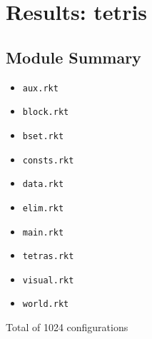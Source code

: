 \documentclass{article}
\newcommand{\mono}[1]{\texttt{#1}}
\begin{document}
\section{Results: tetris}

\subsection{Module Summary}
\begin{itemize}
\item \mono{aux.rkt}
\item \mono{block.rkt}
\item \mono{bset.rkt}
\item \mono{consts.rkt}
\item \mono{data.rkt}
\item \mono{elim.rkt}
\item \mono{main.rkt}
\item \mono{tetras.rkt}
\item \mono{visual.rkt}
\item \mono{world.rkt}\end{itemize}
Total of 1024 configurations
\end{document}
